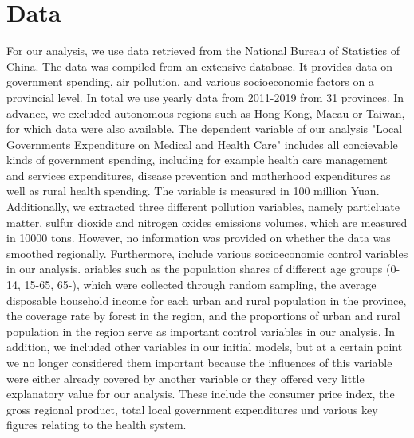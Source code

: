 \documentclass[
]{article}
\begin{document}
	
	
	\section{Data} \label{Data}
	
	For our analysis, we use data retrieved from the National Bureau of Statistics of China. The data was compiled from an extensive database. It provides data on government spending, air pollution, and various socioeconomic factors on a provincial level. In total we use yearly data from 2011-2019 from 31 provinces. In advance, we excluded autonomous regions such as Hong Kong, Macau or Taiwan, for which data were also available. The dependent variable of our analysis "Local Governments Expenditure on Medical and Health Care" includes all concievable kinds of government spending, including for example health care management and services expenditures, disease prevention and motherhood expenditures as well as rural health spending. The variable is measured in 100 million Yuan. Additionally, we extracted three different pollution variables, namely particluate matter, sulfur dioxide and nitrogen oxides emissions volumes, which are measured in 10000 tons. However, no information was provided on whether the data was smoothed regionally. Furthermore, include various socioeconomic control variables in our analysis. ariables such as the population shares of different age groups (0-14, 15-65, 65-), which were collected through random sampling, the average disposable household income for each urban and rural population in the province, the coverage rate by forest in the region, and the proportions of urban and rural population in the region serve as important control variables in our analysis. 
	In addition, we included other variables in our initial models, but at a certain point we no longer considered them important because the influences of this variable were either already covered by another variable or they offered very little explanatory value for our analysis. These include the consumer price index, the gross regional product, total local government expenditures und various key figures relating to the health system.
	
\end{document}
